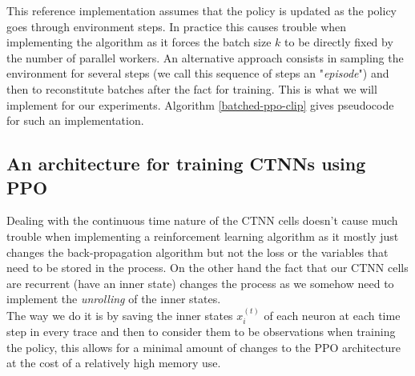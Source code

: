 This reference implementation assumes that the policy is updated as the policy goes through environment steps. In practice this causes trouble when implementing the algorithm as it forces the batch size $k$ to be directly fixed by the number of parallel workers. An alternative approach consists in sampling the environment for several steps (we call this sequence of steps an "\textit{episode}") and then to reconstitute batches after the fact for training. This is what we will implement for our experiments. Algorithm \ref{batched-ppo-clip} gives pseudocode for such an implementation.




\subsection{An architecture for training CTNNs using PPO}

Dealing with the continuous time nature of the CTNN cells doesn't cause much trouble when implementing a reinforcement learning algorithm as it mostly just changes the back-propagation algorithm but not the loss or the variables that need to be stored in the process. On the other hand the fact that our CTNN cells are recurrent (have an inner state) changes the process as we somehow need to implement the \textit{unrolling} of the inner states. \\

The way we do it is by saving the inner states $x_i^{(t)}$ of each neuron at each time step in every trace and then to consider them to be observations when training the policy, this allows for a minimal amount of changes to the PPO architecture at the cost of a relatively high memory use.